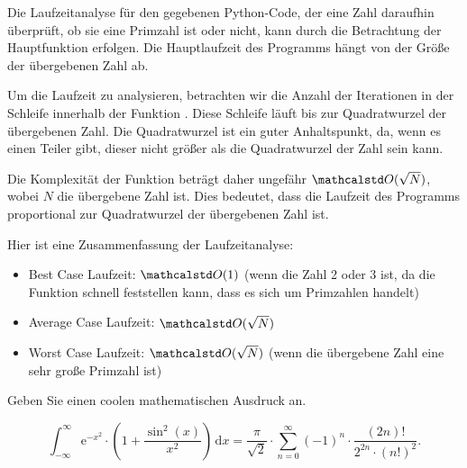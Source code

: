 \documentclass[10pt]{article}
\begin{document}
\begin{task}[Primzahlüberprüfung]
\begin{subtask}
            \begin{solution}
                Die Laufzeitanalyse für den gegebenen Python-Code, der eine Zahl daraufhin überprüft, ob sie eine Primzahl ist oder nicht, kann durch die Betrachtung der Hauptfunktion  erfolgen.
                Die Hauptlaufzeit des Programms hängt von der Größe der übergebenen Zahl ab.

                Um die Laufzeit zu analysieren, betrachten wir die Anzahl der Iterationen in der Schleife innerhalb der Funktion .
                Diese Schleife läuft bis zur Quadratwurzel der übergebenen Zahl.
                Die Quadratwurzel ist ein guter Anhaltspunkt, da, wenn es einen Teiler gibt, dieser nicht größer als die Quadratwurzel der Zahl sein kann.

                Die Komplexität der Funktion  beträgt daher ungefähr $\O(\sqrt{N})$, wobei $N$ die übergebene Zahl ist.
                Dies bedeutet, dass die Laufzeit des Programms proportional zur Quadratwurzel der übergebenen Zahl ist.

                Hier ist eine Zusammenfassung der Laufzeitanalyse:

                \begin{itemize}
                    \item Best Case Laufzeit: $\O(1)$ (wenn die Zahl 2 oder 3 ist, da die Funktion schnell feststellen kann, dass es sich um Primzahlen handelt)
                    \item Average Case Laufzeit: $\O(\sqrt{N})$
                    \item Worst Case Laufzeit: $\O(\sqrt{N})$ (wenn die übergebene Zahl eine sehr große Primzahl ist)
                \end{itemize}
            \end{solution}
        \end{subtask}
    \end{task}

    \begin{task}[Mathematik]
        Geben Sie einen coolen mathematischen Ausdruck an.

        \begin{solution}
            \[
                \int_{-\infty}^{\infty} \mathrm{e}^{-x^2} \cdot \left(1 + \frac{\sin^2(x)}{x^2}\right) \, \mathrm{d}x = \frac{\pi}{\sqrt{2}} \cdot \sum_{n=0}^{\infty} (-1)^n \cdot \frac{(2n)!}{2^{2n} \cdot (n!)^2}.
            \]
        \end{solution}
    \end{task}
\end{document}
